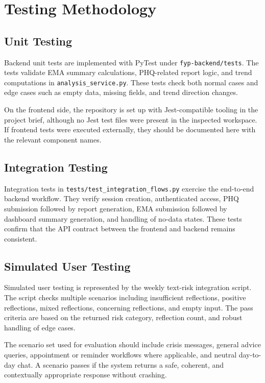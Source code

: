 \section{Testing Methodology}

\subsection{Unit Testing}

Backend unit tests are implemented with PyTest under \texttt{fyp-backend/tests}. The tests validate EMA summary calculations, PHQ-related report logic, and trend computations in \texttt{analysis\_service.py}. These tests check both normal cases and edge cases such as empty data, missing fields, and trend direction changes.

On the frontend side, the repository is set up with Jest-compatible tooling in the project brief, although no Jest test files were present in the inspected workspace. If frontend tests were executed externally, they should be documented here with the relevant component names.

\subsection{Integration Testing}

Integration tests in \texttt{tests/test\_integration\_flows.py} exercise the end-to-end backend workflow. They verify session creation, authenticated access, PHQ submission followed by report generation, EMA submission followed by dashboard summary generation, and handling of no-data states. These tests confirm that the API contract between the frontend and backend remains consistent.

\subsection{Simulated User Testing}

Simulated user testing is represented by the weekly text-risk integration script. The script checks multiple scenarios including insufficient reflections, positive reflections, mixed reflections, concerning reflections, and empty input. The pass criteria are based on the returned risk category, reflection count, and robust handling of edge cases.

The scenario set used for evaluation should include crisis messages, general advice queries, appointment or reminder workflows where applicable, and neutral day-to-day chat. A scenario passes if the system returns a safe, coherent, and contextually appropriate response without crashing.

